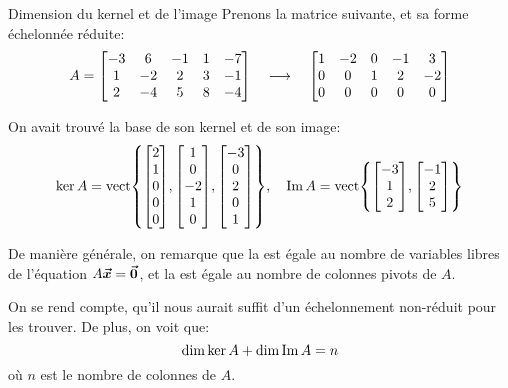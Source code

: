 \documentclass[a4paper]{article}
\begin{document}
\begin{parag}{Dimension du kernel et de l'image}
    Prenons la matrice suivante, et sa forme échelonnée réduite:
    \[A = \begin{bmatrix} -3 & 6 & -1 & 1 & -7 \\ 1 & -2 & 2 & 3 & -1 \\ 2 & -4 & 5 & 8 & -4 \end{bmatrix} \quad \longrightarrow \quad \begin{bmatrix} 1 & -2 & 0 & -1 & 3 \\ 0 & 0 & 1 & 2 & -2 \\ 0 & 0 & 0 & 0 & 0 \end{bmatrix} \]

    On avait trouvé la base de son kernel et de son image:
    \[\ker A = \vect\left\{\begin{bmatrix} 2 \\ 1 \\ 0 \\ 0 \\ 0 \end{bmatrix}, \begin{bmatrix} 1 \\ 0 \\ -2 \\ 1 \\ 0 \end{bmatrix}, \begin{bmatrix} -3 \\ 0 \\ 2 \\ 0 \\ 1 \end{bmatrix} \right\}, \mathspace \im A = \vect \left\{\begin{bmatrix} -3 \\ 1 \\ 2 \end{bmatrix}, \begin{bmatrix} -1 \\ 2 \\ 5 \end{bmatrix} \right\}\]

    De manière générale, on remarque que la  est égale au nombre de variables libres de l'équation $A \bm{\protect\vec{x}} = \bm{\protect\vec{0}}$, et la  est égale au nombre de colonnes pivots de $A$.

    On se rend compte, qu'il nous aurait suffit d'un échelonnement non-réduit pour les trouver. De plus, on voit que:
    \[\dim \ker A + \dim \operatorname{Im} A = n\]
    où $n$ est le nombre de colonnes de $A$.
\end{parag}
\end{document}
